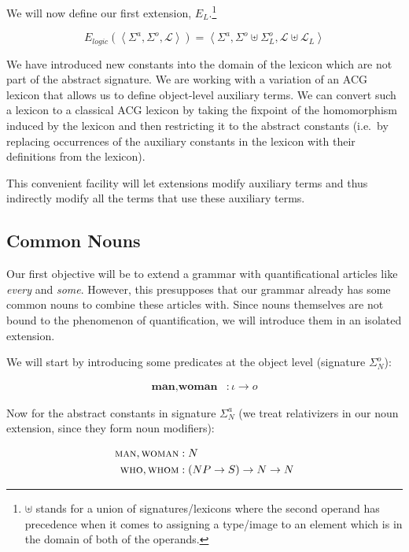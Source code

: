 \documentclass{article}
\newcommand{\abs}[1]{\textsc{#1}}
\newcommand{\obj}[1]{\textbf{#1}}
\begin{document}
We will now define our first extension, $E_L$.\footnote{$\uplus$ stands for
  a union of signatures/lexicons where the second operand has precedence
  when it comes to assigning a type/image to an element which is in the
  domain of both of the operands.}

$$
E_{logic}(\left< \Sigma^a, \Sigma^o, \mathcal{L} \right>) = \left< \Sigma^a, \Sigma^o \uplus \Sigma^o_L, \mathcal{L} \uplus \mathcal{L}_L \right>
$$

We have introduced new constants into the domain of the lexicon which are
not part of the abstract signature. We are working with a variation of an
ACG lexicon that allows us to define object-level auxiliary terms. We can
convert such a lexicon to a classical ACG lexicon by taking the fixpoint of
the homomorphism induced by the lexicon and then restricting it to the
abstract constants (i.e.\ by replacing occurrences of the auxiliary
constants in the lexicon with their definitions from the lexicon).

This convenient facility will let extensions modify auxiliary terms and
thus indirectly modify all the terms that use these auxiliary terms.


\subsection{Common Nouns}

Our first objective will be to extend a grammar with quantificational
articles like \textit{every} and \textit{some}. However, this presupposes
that our grammar already has some common nouns to combine these articles
with. Since nouns themselves are not bound to the phenomenon of
quantification, we will introduce them in an isolated extension.

We will start by introducing some predicates at the object level (signature
$\Sigma^o_N$):

\begin{align*}
  \obj{man}, \obj{woman} &: \iota \to o
\end{align*}

Now for the abstract constants in signature $\Sigma^a_N$ (we treat
relativizers in our noun extension, since they form noun modifiers):

\begin{align*}
  \abs{man}, \abs{woman} &: N \\
  \abs{who}, \abs{whom} &: (NP \to S) \to N \to N
\end{align*}
\end{document}
